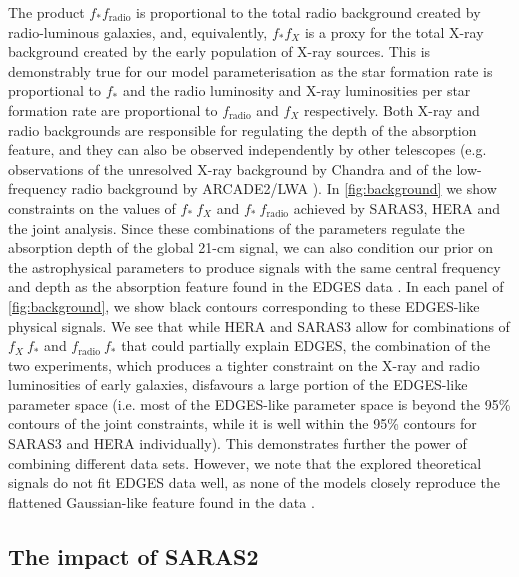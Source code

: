 The product  $f_* f_\mathrm{radio}$ is proportional to the total radio background created by radio-luminous galaxies, and, equivalently, $f_* f_X$ is a proxy for
the total X-ray background created by the early population of X-ray sources. This is demonstrably true for our model parameterisation as the star formation rate is proportional to $f_*$ and the radio luminosity and X-ray luminosities per star formation rate are proportional to $f_\mathrm{radio}$ and $f_X$ respectively. Both X-ray and radio backgrounds are responsible for regulating the depth of the absorption feature, and they can also be observed independently by other telescopes (e.g. observations of the unresolved X-ray background by Chandra \cite{Lehmer_Chandra_2012} and of the low-frequency radio background by ARCADE2/LWA \cite{fixsen_arcade_2011, dowell_radio_2018}). In \cref{fig:background} we show constraints on the values of $f_*~f_X$ and $f_*~f_\mathrm{radio}$ achieved by SARAS3, HERA and the joint analysis. Since these combinations of the parameters regulate the absorption depth of the global 21-cm signal, we can also condition our prior on the astrophysical parameters to produce signals with the same central frequency and depth as the absorption feature found in the EDGES data \cite{Fialkov2019, Reis_sta_2021, Bevins_saras3_2022}. In each panel of \cref{fig:background}, we show black contours corresponding to these EDGES-like physical signals. We see that while HERA and SARAS3 allow for combinations of $f_X~f_*$ and $f_\mathrm{radio}~f_*$ that could  partially explain EDGES, the combination of the two experiments, which produces a tighter constraint on the X-ray and radio luminosities of early galaxies, disfavours a large portion of the EDGES-like parameter space (i.e. most of the EDGES-like parameter space is beyond the 95\% contours of the joint constraints, while it is well within the 95\% contours for SARAS3 and HERA individually). This demonstrates further the power of combining different data sets. However, we note that the explored theoretical signals do not fit EDGES data well, as none of the models closely reproduce the flattened Gaussian-like feature found in the data \cite{Bowman_edges_2018}.

\subsection{The impact of SARAS2}

